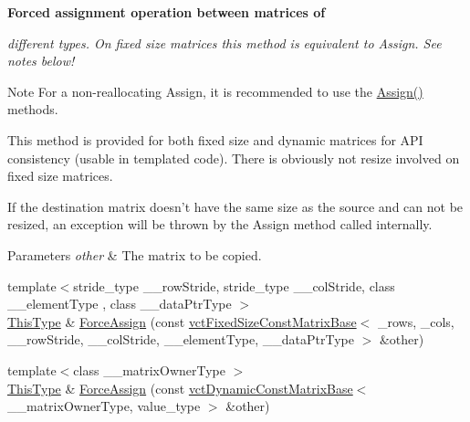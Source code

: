 \begin{Indent}{\bf Forced assignment operation between matrices of}\par
{\em different types. On fixed size matrices this method is equivalent to Assign. See notes below!

\begin{DoxyNote}{Note}
For a non-\/reallocating Assign, it is recommended to use the \hyperlink{classvct_fixed_size_matrix_base_a1bf6174aa97f71d7d33df7a92a368683}{Assign()} methods.

This method is provided for both fixed size and dynamic matrices for A\-P\-I consistency (usable in templated code). There is obviously not resize involved on fixed size matrices.

If the destination matrix doesn't have the same size as the source and can not be resized, an exception will be thrown by the Assign method called internally.
\end{DoxyNote}

\begin{DoxyParams}{Parameters}
{\em other} & The matrix to be copied. \\
\hline
\end{DoxyParams}
}\begin{DoxyCompactItemize}
\item 
{\footnotesize template$<$stride\-\_\-type \-\_\-\-\_\-row\-Stride, stride\-\_\-type \-\_\-\-\_\-col\-Stride, class \-\_\-\-\_\-element\-Type , class \-\_\-\-\_\-data\-Ptr\-Type $>$ }\\\hyperlink{classvct_fixed_size_const_matrix_base_a7ec66a96ed7e08ce9ff54093133c9d8d}{This\-Type} \& \hyperlink{classvct_fixed_size_matrix_base_a5b1643ef718915ca085dd69af8a2b994}{Force\-Assign} (const \hyperlink{classvct_fixed_size_const_matrix_base}{vct\-Fixed\-Size\-Const\-Matrix\-Base}$<$ \-\_\-rows, \-\_\-cols, \-\_\-\-\_\-row\-Stride, \-\_\-\-\_\-col\-Stride, \-\_\-\-\_\-element\-Type, \-\_\-\-\_\-data\-Ptr\-Type $>$ \&other)
\item 
{\footnotesize template$<$class \-\_\-\-\_\-matrix\-Owner\-Type $>$ }\\\hyperlink{classvct_fixed_size_const_matrix_base_a7ec66a96ed7e08ce9ff54093133c9d8d}{This\-Type} \& \hyperlink{classvct_fixed_size_matrix_base_a21e9dcb38745fe99aab58b482d2f2df1}{Force\-Assign} (const \hyperlink{classvct_dynamic_const_matrix_base}{vct\-Dynamic\-Const\-Matrix\-Base}$<$ \-\_\-\-\_\-matrix\-Owner\-Type, value\-\_\-type $>$ \&other)
\end{DoxyCompactItemize}
\end{Indent}
